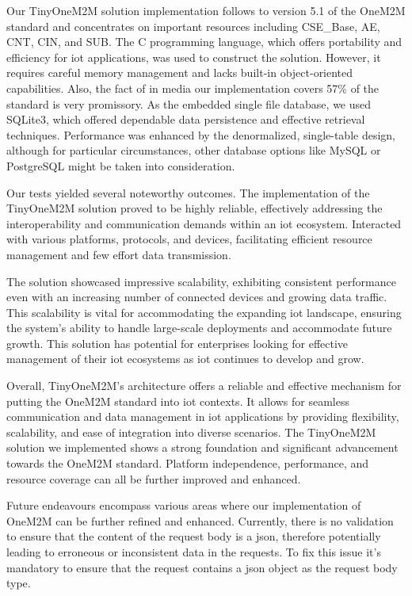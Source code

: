 \documentclass[a4paper,fleqn]{cas-dc}
\begin{document}
Our TinyOneM2M solution implementation follows to version 5.1 of the OneM2M standard and concentrates on important resources including CSE\_Base, AE, CNT, CIN, and SUB. The C programming language, which offers portability and efficiency for \gls{iot} applications, was used to construct the solution. However, it requires careful memory management and lacks built-in object-oriented capabilities. Also, the fact of in media our implementation covers 57\% of the standard is very promissory. As the embedded single file database, we used SQLite3, which offered dependable data persistence and effective retrieval techniques. Performance was enhanced by the denormalized, single-table design, although for particular circumstances, other database options like MySQL or PostgreSQL might be taken into consideration.

Our tests yielded several noteworthy outcomes. The implementation of the TinyOneM2M solution proved to be highly reliable, effectively addressing the interoperability and communication demands within an \gls{iot} ecosystem. Interacted with various platforms, protocols, and devices, facilitating efficient resource management and few effort data transmission. 

The solution showcased impressive scalability, exhibiting consistent performance even with an increasing number of connected devices and growing data traffic. This scalability is vital for accommodating the expanding \gls{iot} landscape, ensuring the system's ability to handle large-scale deployments and accommodate future growth. This solution has potential for enterprises looking for effective management of their \gls{iot} ecosystems as \gls{iot} continues to develop and grow.

Overall, TinyOneM2M's architecture offers a reliable and effective mechanism for putting the OneM2M standard into \gls{iot} contexts. It allows for seamless communication and data management in \gls{iot} applications by providing flexibility, scalability, and ease of integration into diverse scenarios. The TinyOneM2M solution we implemented shows a strong foundation and significant advancement towards the OneM2M standard. Platform independence, performance, and resource coverage can all be further improved and enhanced.

Future endeavours encompass various areas where our implementation of OneM2M can be further refined and enhanced. Currently, there is no validation to ensure that the content of the request body is a \gls{json}, therefore potentially leading to erroneous or inconsistent data in the requests. To fix this issue it's mandatory to ensure that the request contains a \gls{json} object as the request body type. 
\end{document}
